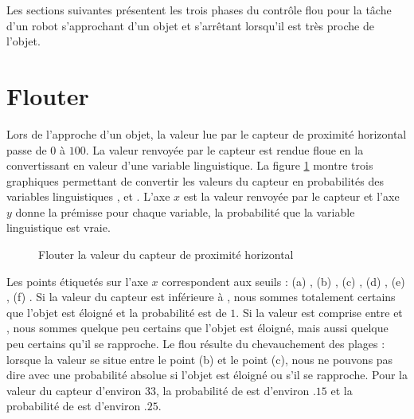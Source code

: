 Les sections suivantes présentent les trois phases du contrôle flou pour la tâche d'un robot s'approchant d'un objet et s'arrêtant lorsqu'il est très proche de l'objet.

\section{Flouter}

Lors de l'approche d'un objet, la valeur lue par le capteur de proximité horizontal passe de $0$ à $100$. La valeur renvoyée par le capteur est rendue floue en la convertissant en valeur d'une variable linguistique. La figure \ref{fig.fuzz} montre trois graphiques permettant de convertir les valeurs du capteur en probabilités des variables linguistiques  ,  et . L'axe $x$ est la valeur renvoyée par le capteur et l'axe $y$ donne la prémisse pour chaque variable, la probabilité que la variable linguistique est vraie.


\begin{figure}
\begin{center}
\caption{Flouter la valeur du capteur de proximité horizontal}\label{fig.fuzz}
\end{center}
\end{figure}

Les points étiquetés sur l'axe $x$ correspondent aux seuils : (a) , (b) , (c) , (d) , (e) , (f) . Si la valeur du capteur est inférieure à , nous sommes totalement certains que l'objet est éloigné et la probabilité est de $1$. Si la valeur est comprise entre  et , nous sommes quelque peu certains que l'objet est éloigné, mais aussi quelque peu certains qu'il se rapproche. Le flou résulte du chevauchement des plages : lorsque la valeur se situe entre le point (b) et le point (c), nous ne pouvons pas dire avec une probabilité absolue si l'objet est éloigné ou s'il se rapproche. Pour la valeur du capteur  d'environ $33$, la probabilité de  est d'environ $.15$ et la probabilité de  est d'environ $.25$.

